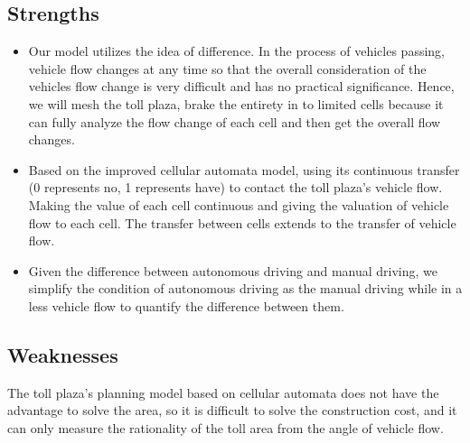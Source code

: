 \documentclass{mcmthesis}
\begin{document}
\subsection{Strengths}
\begin{itemize}
\item %
Our model utilizes the idea of difference. In the process of vehicles passing, vehicle flow changes at any time so that the overall consideration of the vehicles flow change is very difficult and has no practical significance. Hence, we will mesh the toll plaza, brake the entirety in to limited cells because it can fully analyze the flow change of each cell and then get the overall flow changes.
\item %
Based on the improved cellular automata model, using its continuous transfer (0 represents no, 1 represents have) to contact the toll plaza’s vehicle flow. Making the value of each cell continuous and giving the valuation of vehicle flow to each cell. The transfer between cells extends to the transfer of vehicle flow.
\item %
Given the difference between autonomous driving and manual driving, we simplify the condition of autonomous driving as the manual driving while in a less vehicle flow to quantify the difference between them.
\end{itemize}
\subsection{Weaknesses}
The toll plaza’s planning model based on cellular automata does not have the advantage to solve the area, so it is difficult to solve the construction cost, and it can only measure the rationality of the toll area from the angle of vehicle flow.
\newpage


\newpage
\end{document}

